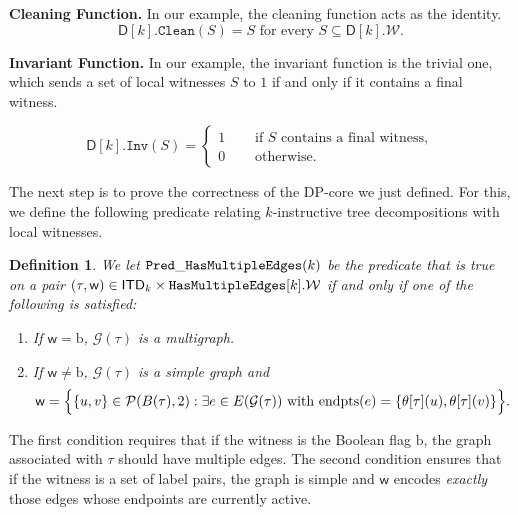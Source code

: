 \documentclass[11pt,a4paper]{article}
\newtheorem{definition}[theorem]{Definition}
\newcommand{\treewidthvalue}{k}
\newcommand{\decompositiongraph}[1]{\mathcal{G}(#1)}
\newcommand{\edgeset}[1]{E(#1)}
\newcommand{\edgeendpointsname}{\mathrm{endpts}}
\newcommand{\anedge}{e}
\newcommand{\cleaningfunctioncore}{\mathtt{Clean}}
\newcommand{\topbagname}{B}
\newcommand{\topbag}[1]{\topbagname(#1)}
\newcommand{\allabstractdecompositionstreewidth}[1]{\mathsf{ITD}_{#1}}
\newcommand{\abstractdecomposition}{\tau}
\newcommand{\allwitnesses}{\mathcal{W}}
\newcommand{\awitness}{\mathsf{w}}
\newcommand{\powersetchoosek}[2]{\mathcal{P}(#1,#2)}
\newcommand{\dpcore}{\mathsf{D}}
\newcommand{\witnessset}{S}
\newcommand{\dpNamePart}[1]{\mbox{\normalfont\ttfamily #1}}
\newcommand{\predicateHasMultiEdge}[1]{\dpNamePart{Pred}\_\allowbreak\dpNamePart{HasMultipleEdges}(#1)}
\newcommand{\hasMultiEdgeCore}{\dpNamePart{HasMultipleEdges}}
\newcommand{\topmapname}{\theta}
\newcommand{\topmap}[1]{\topmapname[#1]}
\newcommand{\invariantCore}{\mathtt{Inv}}
\newcommand{\multiedgefound}{\mathrm{b}}
\begin{document}
{	\noindent\textbf{Cleaning Function.}
	In our example, the cleaning function acts as the identity.
	\[
	\dpcore[\treewidthvalue].\cleaningfunctioncore(\witnessset)=\witnessset \text{ for every }
		\witnessset \subseteq \dpcore[\treewidthvalue].\allwitnesses.
	\]

	\noindent\textbf{Invariant Function.}
	In our example, the invariant function is the trivial one, which sends a set of local witnesses \(\witnessset\) to \(1\) if and only if it contains a final witness.

	\[
	\dpcore[\treewidthvalue].\invariantCore(\witnessset)=
		\begin{cases}
			1 & \quad \text{ if } \witnessset \text{ contains a final witness}, \\
			0 & \quad \text{ otherwise}.
		\end{cases}
	\]

	The next step is to prove the correctness of the DP-core we just defined. For this, we define the following predicate relating \(\treewidthvalue\)-instructive tree decompositions with local witnesses.

		\begin{definition}
			\label{definition:PredicateHasMultiEdge}
			We let \(\predicateHasMultiEdge{\treewidthvalue}\) be the predicate that is true on a pair \((\abstractdecomposition,\awitness) \in \allabstractdecompositionstreewidth{\treewidthvalue} \times \hasMultiEdgeCore[\treewidthvalue].\allwitnesses\) if and only if one of the following is satisfied:
			\begin{enumerate}
				\item If \(\awitness = \multiedgefound\), \(\decompositiongraph{\abstractdecomposition}\) is a multigraph.
				\item If \(\awitness \neq \multiedgefound\), \(\decompositiongraph{\abstractdecomposition}\) is a simple graph and
				\[
					\awitness
					=
					\Bigl\{\{u,v\}\in \powersetchoosek{\topbag{\abstractdecomposition}}{2} : \exists \anedge \in \edgeset{\decompositiongraph{\abstractdecomposition}} \text{ with }
					\edgeendpointsname(\anedge)=\{\topmap{\abstractdecomposition}(u),\topmap{\abstractdecomposition}(v)\}\Bigr\}.
				\]
			\end{enumerate}
		\end{definition}

		The first condition requires that if the witness is the Boolean flag \(\multiedgefound\), the graph associated with \(\abstractdecomposition\) should have multiple edges. The second condition ensures that if the witness is a set of label pairs, the graph is simple and \(\awitness\) encodes \emph{exactly} those edges whose endpoints are currently active.

}
\end{document}

